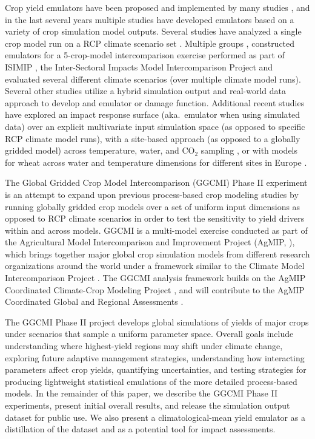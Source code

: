 \documentclass[preprint, 5p, times, twocolumn]{elsarticle}
\begin{document}
Crop yield emulators have been proposed and implemented by many studies \citep[e.g.\ ][]{Howden2005, raisen2006, Lobell2010, Iizumi2010, Ferrise2011, Holzkamper2012, RUANE2013a, Markowski2015}, and in the last several years multiple studies have developed emulators based on a variety of crop simulation model outputs. Several studies have analyzed a single crop model run on a RCP climate scenario set \citep[e.g.\ ][]{Oyebamiji15}. Multiple groups \citep[e.g.\ ][]{BLANC2015, BLANC2017, Ostberg2018}, constructed emulators for a 5-crop-model intercomparison exercise performed as part of ISIMIP \citep{Warszawski3228}, the Inter-Sectoral Impacts Model Intercomparison Project and evaluated several different climate scenarios (over multiple climate model runs). Several other studies \citep[e.g.\ ][]{Moore2017, Mistry2017} utilize a hybrid simulation output and real-world data approach to develop and emulator or damage function. Additional recent studies have explored an impact response surface (aka.\ emulator when using simulated data) over an explicit multivariate input simulation space (as opposed to specific RCP climate model runs), with a site-based approach (as opposed to a globally gridded model) across temperature, water, and CO$_2$ sampling \citep{snyder2018}, or with models for wheat across water and temperature dimensions for different sites in Europe \citep{FRONZEK20182}. 

The Global Gridded Crop Model Intercomparison (GGCMI) Phase II experiment is an attempt to expand upon previous process-based crop modeling studies by running globally gridded crop models over a set of uniform input dimensions as opposed to RCP climate scenarios in order to test the sensitivity to yield drivers within and across models. GGCMI is a multi-model exercise conducted as part of the Agricultural Model Intercomparison and Improvement Project (AgMIP, \citep{ROSENZWEIG2013, Rosenzweig2014}), which brings together major global crop simulation models from different research organizations around the world under a framework similar to the Climate Model Intercomparison Project \citep[CMIP,~][]{Taylor2012, Eyring2016}. The GGCMI analysis framework builds on the AgMIP Coordinated Climate-Crop Modeling Project \citep[C3MP,~][]{ruane2014, mcdermid2015}, and will contribute to the AgMIP Coordinated Global and Regional Assessments \citep[CGRA,~][]{ruane2018, rosenzweig2018}. 

The GGCMI Phase II project develops global simulations of yields of major crops under scenarios that sample a uniform parameter space. Overall goals include understanding where highest-yield regions may shift under climate change, exploring future adaptive management strategies, understanding how interacting parameters affect crop yields, quantifying uncertainties, and testing strategies for producing lightweight statistical emulations of the more detailed process-based models. In the remainder of this paper, we describe the GGCMI Phase II experiments, present initial overall results, and release the simulation output dataset for public use. We also present a climatological-mean yield emulator as a distillation of the dataset and as a potential tool for impact assessments.
\end{document}
